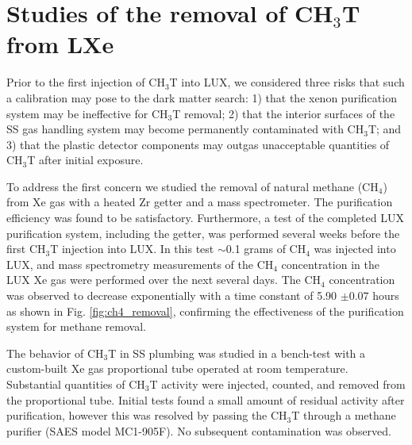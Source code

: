\section{Studies of the removal of CH$_3$T from LXe }
\label{sec:appendix1}

\newcommand*{\Scale}[2][4]{\scalebox{#1}{$#2$}}%

Prior to the first injection of CH$_3$T into LUX, we considered three risks that such a calibration may pose to the dark matter search: 1) that the xenon purification system may be ineffective for CH$_3$T removal; 2) that the interior surfaces of the SS gas handling system may become permanently contaminated with CH$_3$T; and 3) that the plastic detector components may outgas unacceptable quantities of CH$_3$T after initial exposure.

To address the first concern we studied the removal of natural methane (CH$_4$) from Xe gas with a heated Zr getter and a mass spectrometer. The purification efficiency was found to be satisfactory\cite{Dobi_CH4}. Furthermore, a test of the completed LUX purification system, including the getter, was performed several weeks before the first CH$_3$T injection into LUX. In this test $\sim$0.1 grams of CH$_4$ was injected into LUX, and mass spectrometry measurements of the CH$_4$ concentration in the LUX Xe gas were performed over the next several days. The CH$_4$ concentration was observed to decrease exponentially with a time constant of 5.90 $\pm 0.07$ hours as shown in Fig. \ref{fig:ch4_removal}, confirming the effectiveness of the purification system for methane removal.

The behavior of CH$_3$T in SS plumbing was studied in a bench-test with a custom-built Xe gas proportional tube operated at room temperature. Substantial quantities of CH$_3$T activity were injected, counted, and removed from the proportional tube. Initial tests found a small amount of residual activity after purification, however this was resolved by passing the CH$_3$T through a methane purifier (SAES model MC1-905F). No subsequent contamination was observed.

